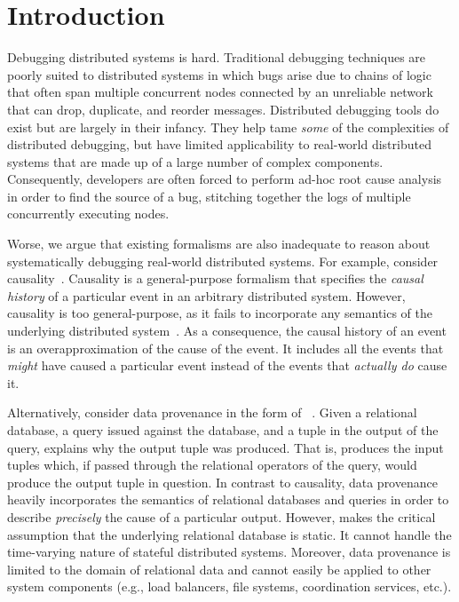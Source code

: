\section{Introduction}
Debugging distributed systems is hard. Traditional debugging techniques are
poorly suited to distributed systems in which bugs arise due to chains of logic
that often span multiple concurrent nodes connected by an unreliable network that can
drop, duplicate, and reorder messages. Distributed debugging tools do
exist but are largely in their infancy. They help tame \emph{some} of the
complexities of distributed debugging, but have limited applicability to
real-world distributed systems that are made up of a large number of complex
components. Consequently, developers are often forced to perform ad-hoc root
cause analysis in order to find the source of a bug, stitching together the
logs of multiple concurrently executing nodes.

Worse, we argue that existing formalisms are also inadequate to reason about
systematically debugging real-world distributed systems. For example, consider
causality~\cite{lamport1978time}. Causality is a general-purpose formalism that
specifies the \emph{causal history} of a particular event in an arbitrary
distributed system. However, causality is too general-purpose, as it fails to
incorporate any semantics of the underlying distributed
system~\cite{bailis2012potential}. As a consequence, the causal history of an
event is an overapproximation of the cause of the event. It includes all the
events that \emph{might} have caused a particular event
instead of the events that \emph{actually do} cause it.

Alternatively, consider data provenance in the form of
\emph{\whyprovenance{}}~\cite{cheney2009provenance, buneman2001and}. Given a
relational database, a query issued against the database, and a tuple in the
output of the query, \whyprovenance{} explains why the output tuple was
produced. That is, \whyprovenance{} produces the input tuples which, if passed
through the relational operators of the query, would produce the output tuple
in question. In contrast to causality, data provenance heavily incorporates the
semantics of relational databases and queries in order to describe
\emph{precisely} the cause of a particular output. However, \whyprovenance{}
makes the critical assumption that the underlying relational database is
static. It cannot handle the time-varying nature of stateful distributed
systems. Moreover, data provenance is limited to the domain of relational data
and cannot easily be applied to other system components (e.g., load balancers,
file systems, coordination services, etc.).

